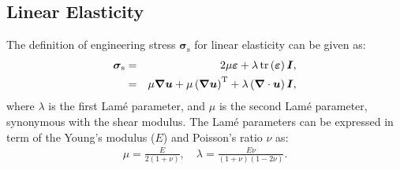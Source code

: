 \documentclass[review,3p]{elsarticle}
\newcommand{\bb}{\boldsymbol}
\begin{document}
\subsection{Linear Elasticity}
The definition of engineering stress $\bb{\sigma}_\text{s}$ for linear elasticity can be given as:
%
\begin{eqnarray}  \label{eq:linearElastic}
	\bb{\sigma}_\text{s}
	&=& 2 \mu \bb{\varepsilon} + \lambda \, \text{tr} \left( \bb{\varepsilon} \right) \bb{I} \notag, \\
	&=& \mu \bb{\nabla} \bb{u} + \mu \left( \bb{\nabla} \bb{u}\right)^{\text{T}} + \lambda \left(\bb{\nabla} \cdot \bb{u} \right) \bb{I},
\end{eqnarray}
%
where $\lambda$ is the first Lam\'{e} parameter, and $\mu$ is the second Lam\'{e} parameter, synonymous with the shear modulus.
The Lam\'{e} parameters can be expressed in term of the Young's modulus ($E$) and Poisson's ratio $\nu$ as:
%
\begin{eqnarray}
	\mu = \frac{E}{2(1 + \nu)}, \quad \lambda = \frac{E \nu}{(1+\nu)(1 - 2\nu)}.
\end{eqnarray}
%
%
%
\end{document}
